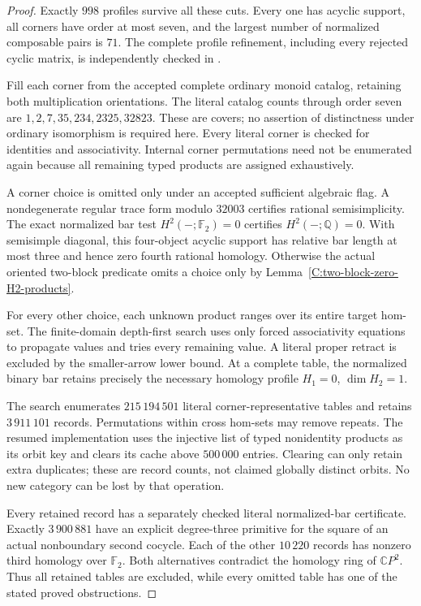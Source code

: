 \begin{proof}
Exactly $998$ profiles survive all these cuts.  Every one has
acyclic support, all corners have order at most seven, and the
largest number of normalized composable pairs is $71$.
The complete profile refinement, including every rejected cyclic
matrix, is independently checked in
.

Fill each corner from the accepted complete ordinary monoid
catalog, retaining both multiplication orientations.  The literal
catalog counts through order seven are
$1,2,7,35,234,2325,32823$.  These are covers; no assertion of
distinctness under ordinary isomorphism is required here.
Every literal corner is checked for identities and associativity.
Internal corner permutations need not be enumerated again because
all remaining typed products are assigned exhaustively.

A corner choice is omitted only under an accepted sufficient
algebraic flag.  A nondegenerate regular trace form modulo $32003$
certifies rational semisimplicity.  The exact normalized bar test
$H^2(-;\mathbb F_2)=0$ certifies $H^2(-;\mathbb Q)=0$.
With semisimple diagonal, this four-object acyclic support has
relative bar length at most three and hence zero fourth rational
homology.  Otherwise the actual oriented two-block predicate
omits a choice only by Lemma~\ref{C:two-block-zero-H2-products}.

For every other choice, each unknown product ranges over its
entire target hom-set.  The finite-domain depth-first search uses
only forced associativity equations to propagate values and tries
every remaining value.  A literal proper retract is excluded by
the smaller-arrow lower bound.  At a complete table, the normalized
binary bar retains precisely the necessary homology profile
$H_1=0$, $\dim H_2=1$.

The search enumerates $215\,194\,501$ literal
corner-representative tables and retains $3\,911\,101$
records.  Permutations within cross hom-sets may remove repeats.
The resumed implementation uses the injective list of typed
nonidentity products as its orbit key and clears its cache above
$500\,000$ entries.  Clearing can only retain extra duplicates;
these are record counts, not claimed globally distinct orbits.
No new category can be lost by that operation.

Every retained record has a separately checked literal
normalized-bar certificate.  Exactly $3\,900\,881$ have
an explicit degree-three primitive for the square of an actual
nonboundary second cocycle.  Each of the other
$10\,220$ records has nonzero third homology over
$\mathbb F_2$.  Both alternatives contradict the homology ring
of $\mathbb CP^2$.  Thus all retained tables are excluded, while
every omitted table has one of the stated proved obstructions.

\end{proof}

